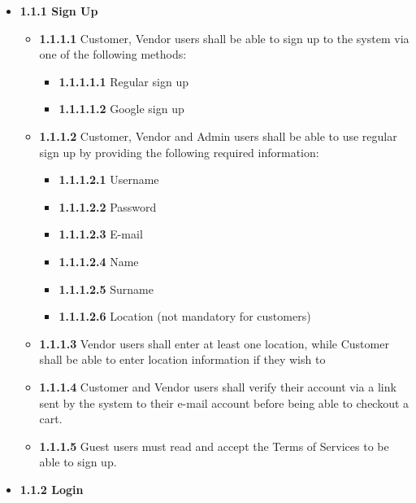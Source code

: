 \documentclass[]{article}
\providecommand{\tightlist}{%
  \setlength{\itemsep}{0pt}\setlength{\parskip}{0pt}}
\begin{document}
\begin{itemize}
    \item
          \textbf{1.1.1 Sign Up}

          \begin{itemize}
              \item
                    \textbf{1.1.1.1} Customer, Vendor users shall be able to sign up to
                    the system via one of the following methods:

                    \begin{itemize}
                        \tightlist
                        \item
                              \textbf{1.1.1.1.1} Regular sign up
                        \item
                              \textbf{1.1.1.1.2} Google sign up
                    \end{itemize}
              \item
                    \textbf{1.1.1.2} Customer, Vendor and Admin users shall be able to
                    use regular sign up by providing the following required information:

                    \begin{itemize}
                        \tightlist
                        \item
                              \textbf{1.1.1.2.1} Username
                        \item
                              \textbf{1.1.1.2.2} Password
                        \item
                              \textbf{1.1.1.2.3} E-mail
                        \item
                              \textbf{1.1.1.2.4} Name
                        \item
                              \textbf{1.1.1.2.5} Surname
                        \item
                              \textbf{1.1.1.2.6} Location (not mandatory for customers)
                    \end{itemize}
              \item
                    \textbf{1.1.1.3} Vendor users shall enter at least one location,
                    while Customer shall be able to enter location information if they
                    wish to
              \item
                    \textbf{1.1.1.4} Customer and Vendor users shall verify their
                    account via a link sent by the system to their e-mail account before
                    being able to checkout a cart.
              \item
                    \textbf{1.1.1.5} Guest users must read and accept the Terms of
                    Services to be able to sign up.
          \end{itemize}
    \item
          \textbf{1.1.2 Login}


\end{itemize}
\end{document}
